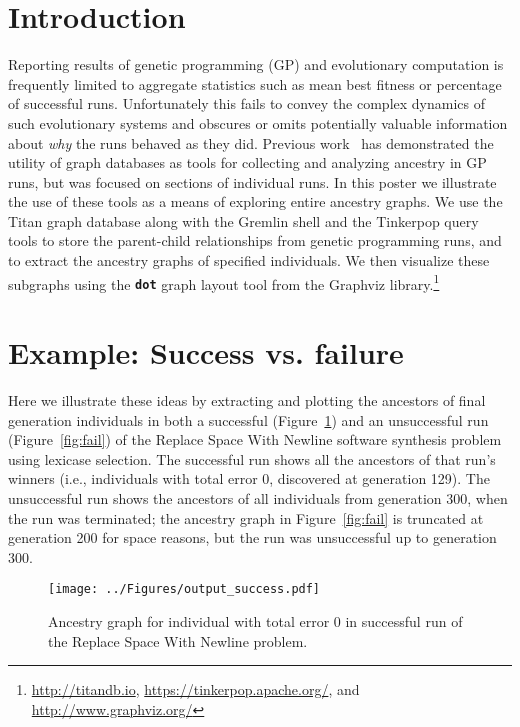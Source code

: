 \section{Introduction}
\label{sec:introduction}

Reporting results of genetic programming (GP) and evolutionary computation is frequently limited to aggregate statistics such as mean best fitness or percentage of successful runs. Unfortunately this fails to convey the complex dynamics of such evolutionary systems and obscures or omits potentially valuable information about \emph{why} the runs behaved as they did. Previous work~\cite{McPhee:2015:GPTP} has demonstrated the utility of graph databases as tools for collecting and analyzing ancestry in GP runs, but was focused on sections of individual runs.
In this poster we illustrate the use of these tools as a means of exploring entire ancestry graphs. We use the Titan graph database along with the Gremlin shell and the Tinkerpop query tools to store the parent-child relationships from genetic programming runs, and to extract the ancestry graphs of specified individuals. We then visualize these subgraphs using the \textbf{\texttt{dot}} graph layout tool from the Graphviz  library.\footnote{\url{http://titandb.io}, \url{https://tinkerpop.apache.org/}, and \url{http://www.graphviz.org/}}

\section{Example: Success vs. failure}
\label{sec:examples}

Here we illustrate these ideas by extracting and plotting the ancestors of final generation individuals in both a successful (Figure~\ref{fig:success}) and an unsuccessful run (Figure~\ref{fig:fail}) of the Replace Space With Newline software synthesis problem~\cite{Helmuth:2015:GECCO,Helmuth:2015:dissertation} using lexicase selection. The successful run shows all the ancestors of that run's winners (i.e., individuals with total error 0, discovered at generation 129). The unsuccessful run shows the ancestors of all individuals from generation 300, when the run was terminated; the ancestry graph in Figure~\ref{fig:fail} is truncated at generation 200 for space reasons, but the run was unsuccessful up to generation 300.

\begin{figure}[t]
	\centering
	\texttt{[image: ../Figures/output\_success.pdf]}
	\caption{Ancestry graph for individual with total error 0 in successful run of the Replace Space With Newline problem.}
	\label{fig:success}
	\vspace{-0.25cm}
\end{figure}

